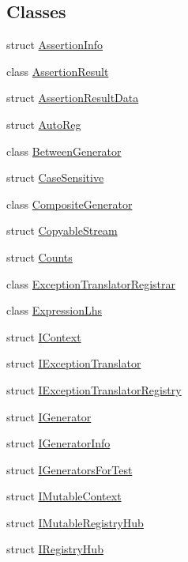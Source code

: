 \subsection*{Classes}
\begin{DoxyCompactItemize}
\item 
struct \hyperlink{struct_catch_1_1_assertion_info}{Assertion\+Info}
\item 
class \hyperlink{class_catch_1_1_assertion_result}{Assertion\+Result}
\item 
struct \hyperlink{struct_catch_1_1_assertion_result_data}{Assertion\+Result\+Data}
\item 
struct \hyperlink{struct_catch_1_1_auto_reg}{Auto\+Reg}
\item 
class \hyperlink{class_catch_1_1_between_generator}{Between\+Generator}
\item 
struct \hyperlink{struct_catch_1_1_case_sensitive}{Case\+Sensitive}
\item 
class \hyperlink{class_catch_1_1_composite_generator}{Composite\+Generator}
\item 
struct \hyperlink{struct_catch_1_1_copyable_stream}{Copyable\+Stream}
\item 
struct \hyperlink{struct_catch_1_1_counts}{Counts}
\item 
class \hyperlink{class_catch_1_1_exception_translator_registrar}{Exception\+Translator\+Registrar}
\item 
class \hyperlink{class_catch_1_1_expression_lhs}{Expression\+Lhs}
\item 
struct \hyperlink{struct_catch_1_1_i_context}{I\+Context}
\item 
struct \hyperlink{struct_catch_1_1_i_exception_translator}{I\+Exception\+Translator}
\item 
struct \hyperlink{struct_catch_1_1_i_exception_translator_registry}{I\+Exception\+Translator\+Registry}
\item 
struct \hyperlink{struct_catch_1_1_i_generator}{I\+Generator}
\item 
struct \hyperlink{struct_catch_1_1_i_generator_info}{I\+Generator\+Info}
\item 
struct \hyperlink{struct_catch_1_1_i_generators_for_test}{I\+Generators\+For\+Test}
\item 
struct \hyperlink{struct_catch_1_1_i_mutable_context}{I\+Mutable\+Context}
\item 
struct \hyperlink{struct_catch_1_1_i_mutable_registry_hub}{I\+Mutable\+Registry\+Hub}
\item 
struct \hyperlink{struct_catch_1_1_i_registry_hub}{I\+Registry\+Hub}

\end{DoxyCompactItemize}
